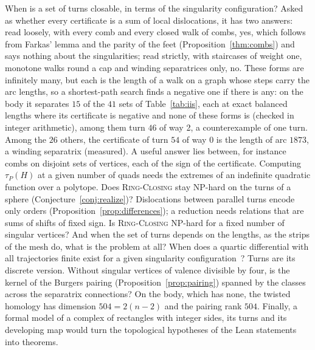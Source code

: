 \documentclass[11pt,a4paper]{article}
\newcommand{\RC}{\textup{\textsc{Ring-Closing}}}
\begin{document}
When is a set of turns closable, in terms of the singularity configuration?
Asked as whether every certificate is a sum of local dislocations, it has two
answers: read loosely, with every comb and every closed walk of combs, yes,
which follows from Farkas' lemma and the parity of the feet
(Proposition~\ref{thm:combs}) and says nothing about the singularities; read
strictly, with staircases of weight one, monotone walks round a cap and
winding separatrices only, no. These forms are infinitely many, but each is
the length of a walk on a graph whose steps carry the arc lengths, so a
shortest-path search finds a negative one if there is any: on the body it
separates $15$ of the $41$ sets of Table~\ref{tab:iis}, each at exact balanced
lengths where its certificate is negative and none of these forms is (checked
in integer arithmetic), among them turn $46$ of way 2, a counterexample of one
turn. Among the $26$ others, the certificate of turn $54$ of way 0 is the length of arc $1873$, a
winding separatrix (measured). A useful answer lies between, for instance
combs on disjoint sets of vertices, each of the sign of the certificate. Computing $\tau_P(H)$ at a given number of quads needs the extremes of an
indefinite quadratic function over a polytope. Does \RC{} stay NP-hard on the
turns of a sphere (Conjecture~\ref{conj:realize})? Dislocations between
parallel turns encode only orders (Proposition~\ref{prop:differences}); a
reduction needs relations that are sums of shifts of fixed sign. Is \RC{} NP-hard for a fixed number of singular vertices? And when
the set of turns depends on the lengths, as the strips of the mesh do, what is
the problem at all? When does a quartic differential with all trajectories finite exist for a
given singularity configuration~\cite{lei2020quartic}? Turns are its discrete
version. Without singular vertices of valence divisible by four, is
the kernel of the Burgers pairing (Proposition~\ref{prop:pairing}) spanned by
the classes across the separatrix connections? On the body, which has none,
the twisted homology has dimension $504 = 2(n - 2)$ and the pairing rank
$504$. Finally, a formal model of a complex
of rectangles with integer sides, its turns and its developing map would turn
the topological hypotheses of the Lean statements into theorems.
\end{document}
